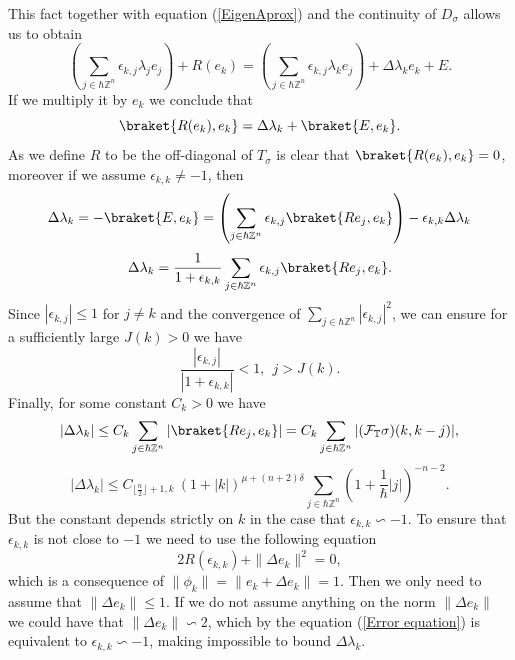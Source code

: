 \documentclass[pdflatex,sn-mathphys-num]{sn-jnl}%
\theoremstyle{thmstyleone}%
\theoremstyle{thmstyletwo}%
\theoremstyle{thmstylethree}%
\begin{document}
\noindent This fact together with equation (\ref{EigenAprox}) and the continuity of $D_\sigma$ allows us to obtain 
\[\left(\sum_{j\in\hbar\mathbb{Z}^n} \epsilon_{k,j}\lambda_j e_j \right)+R(e_k)=  \left(\sum_{j\in\hbar\mathbb{Z}^n} \epsilon_{k,j}\lambda_k e_j \right)+\Delta\lambda_k e_k+E.\]
If we multiply it by $e_k$ we conclude that 
\[\braket{R(e_k),e_k}=\Delta\lambda_k+\braket{E,e_k}.\]
As we define $R$ to be the off-diagonal of $T_\sigma$ is clear that $\braket{R(e_k),e_k}=0$, moreover if we assume $\epsilon_{k,k}\neq -1$, then
\[ \Delta\lambda_k= -\braket{E,e_k}=\left(\sum_{j\in\hbar\mathbb{Z}^n} \epsilon_{k,j} \braket{Re_j,e_k}\right)-\epsilon_{k,k}\Delta\lambda_k \]
\[\Delta\lambda_k=\frac{1}{1+\epsilon_{k,k}}\sum_{j\in\hbar\mathbb{Z}^n} \epsilon_{k,j} \braket{Re_j,e_k}. \]
Since $|\epsilon_{k,j}|\leq 1$ for $j\neq k$ and the convergence of $\sum_{j\in\hbar\mathbb{Z}^n} |\epsilon_{k,j}|^2  $, we can ensure for a sufficiently large $J(k)>0$ we have 
\[\frac{|\epsilon_{k,j}|}{|1+\epsilon_{k,k}|}<1, \ \ j>J(k). \]
Finally, for some constant $C_k>0$ we have 
\[|\Delta\lambda_k|\leq C_k\sum_{j\in\hbar\mathbb{Z}^n}  |\braket{Re_j,e_k}|=C_k\sum_{j\in\hbar\mathbb{Z}^n}  | (\mathcal{F}_{\mathbb{T}} \sigma)(k,k-j)|, \]
\[|\Delta\lambda_k|\leq C_{\lfloor\frac{n}{2}\rfloor +1,k} \ ( 1+|k| )^{\mu+(n+2)\delta}\sum_{j\in\hbar\mathbb{Z}^n} \left( 1+\frac{1}{\hbar}|j| \right)^{-n-2}.\]
But the constant depends strictly on $k$  in the case that $\epsilon_{k,k}\backsim -1$. To ensure that $\epsilon_{k,k}$ is not close to $-1$ we need to use the following equation
\begin{equation}\label{Error equation}
2R(\epsilon_{k,k})+\|\Delta e_k\|^2=0,
\end{equation}
which is a consequence of $\|\phi_k\|=\|e_k+\Delta e_k\|=1$. Then we only need to assume that $\|\Delta e_k\|\leq 1 $. If we do not assume anything on the norm $\|\Delta e_k\|$ we could have that $\|\Delta e_k\|\backsim 2$, which by the equation (\ref{Error equation}) is equivalent to $\epsilon_{k,k}\backsim -1$, making impossible to bound $\Delta \lambda_k$. 
\end{document}
